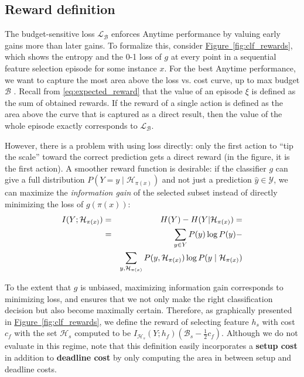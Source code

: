 \subsection{Reward definition}\label{sec:clf_reward}



The budget-sensitive loss $\mathcal{L}_\mathcal{B}$ enforces Anytime performance by valuing early gains more than later gains.
To formalize this, consider \hyperref[fig:clf_rewards]{Figure~\ref*{fig:clf_rewards}}, which shows the entropy and the 0-1 loss of $g$ at every point in a sequential feature selection episode for some instance $x$.
For the best Anytime performance, we want to capture the most area above the loss vs. cost curve, up to max budget $\mathcal{B}$ \parencite{Karayev-NIPS-2012}.
Recall from \eqref{eq:expected_reward} that the value of an episode $\xi$ is defined as the sum of obtained rewards.
If the reward of a single action is defined as the area above the curve that is captured as a direct result, then the value of the whole episode exactly corresponds to $\mathcal{L}_\mathcal{B}$.

However, there is a problem with using loss directly: only the first action to ``tip the scale'' toward the correct prediction gets a direct reward (in the figure, it is the first action).
A smoother reward function is desirable: if the classifier $g$ can give a full distribution $P(Y = y \mid \mathcal{H}_{\pi(x)})$ and not just a prediction $\hat{y} \in \mathcal{Y}$, we can maximize the \emph{information gain} of the selected subset instead of directly minimizing the loss of $g(\pi(x))$:
\begin{eqnarray}
I(Y; \mathcal{H}_{\pi(x)}) &=& H(Y) - H(Y | \mathcal{H}_{\pi(x)}) = \\ \notag
&=& \sum_{y \in Y} P(y) \log P(y) - \\ \notag
&&\sum_{y, \mathcal{H}_{\pi(x)}} P(y, \mathcal{H}_{\pi(x)}) \log P(y \mid \mathcal{H}_{\pi(x)})
\end{eqnarray}

To the extent that $g$ is unbiased, maximizing information gain corresponds to minimizing loss, and ensures that we not only make the right classification decision but also become maximally certain.
Therefore, as graphically presented in \hyperref[fig:clf_rewards]{Figure~\ref*{fig:clf_rewards}}, we define the reward of selecting feature $h_s$ with cost $c_f$ with the set $\mathcal{H}_s$ computed to be $I_{\mathcal{H}_s}(Y; h_f) (\mathcal{B}_s - \frac{1}{2}c_f)$.
Although we do not evaluate in this regime, note that this definition easily incorporates a \textbf{setup cost} in addition to \textbf{deadline cost} by only computing the area in between setup and deadline costs.
